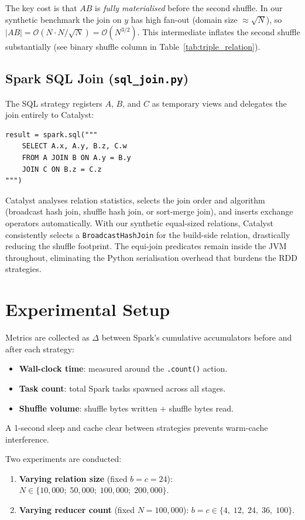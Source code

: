 \documentclass[11pt,a4paper]{article}
\begin{document}
The key cost is that $AB$ is \emph{fully materialised} before the second shuffle. In our synthetic benchmark the join on $y$ has high fan-out (domain size $\approx \sqrt{N}$), so $|AB| = \mathcal{O}(N \cdot N / \sqrt{N}) = \mathcal{O}(N^{3/2})$. This intermediate inflates the second shuffle substantially (see binary shuffle column in Table~\ref{tab:triple_relation}).

\subsection*{Spark SQL Join (\texttt{sql\_join.py})}

The SQL strategy registers $A$, $B$, and $C$ as temporary views and delegates the join entirely to Catalyst:

\begin{lstlisting}[caption=Spark SQL Triple Join]
result = spark.sql("""
    SELECT A.x, A.y, B.z, C.w
    FROM A JOIN B ON A.y = B.y
    JOIN C ON B.z = C.z
""")
\end{lstlisting}

Catalyst analyses relation statistics, selects the join order and algorithm (broadcast hash join, shuffle hash join, or sort-merge join), and inserts exchange operators automatically. With our synthetic equal-sized relations, Catalyst consistently selects a \texttt{BroadcastHashJoin} for the build-side relation, drastically reducing the shuffle footprint. The equi-join predicates remain inside the JVM throughout, eliminating the Python serialisation overhead that burdens the RDD strategies.

\section*{Experimental Setup}

Metrics are collected as $\Delta$ between Spark's cumulative accumulators before and after each strategy:
\begin{itemize}
    \item \textbf{Wall-clock time}: measured around the \texttt{.count()} action.
    \item \textbf{Task count}: total Spark tasks spawned across all stages.
    \item \textbf{Shuffle volume}: shuffle bytes written $+$ shuffle bytes read.
\end{itemize}
A 1-second sleep and cache clear between strategies prevents warm-cache interference.

Two experiments are conducted:
\begin{enumerate}
    \item \textbf{Varying relation size} (fixed $b = c = 24$): $N \in \{10{,}000;\; 50{,}000;\; 100{,}000;\; 200{,}000\}$.
    \item \textbf{Varying reducer count} (fixed $N = 100{,}000$): $b = c \in \{4,\; 12,\; 24,\; 36,\; 100\}$.
\end{enumerate}
\end{document}
